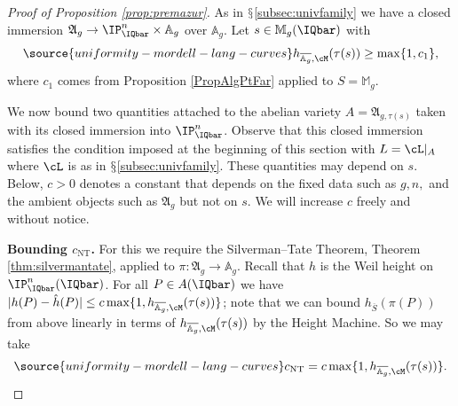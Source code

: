 \begin{proof}[Proof of Proposition \ref{prop:premazur}]
  As in $\mathsection$\ref{subsec:univfamily} %
  we have a
  closed immersion
  $\mathfrak{A}_g \rightarrow\IP^n_\IQbar\times \mathbb{A}_g$ over $\mathbb{A}_g$.
  Let $s\in \mathbb{M}_g(\IQbar)$  with
  \begin{equation}
    \label{eq:hslbc1}
\source{uniformity-mordell-lang-curves}
    h_{\overline{\mathbb{A}_g},\cM}(\tau(s)) \ge \max\{1,c_1\},
  \end{equation}
  where $c_1$
  comes from Proposition \ref{PropAlgPtFar} applied to $S = \mathbb{M}_g$.

  We now bound two quantities attached to the abelian variety
  $A=\mathfrak{A}_{g,\tau(s)}$ taken with its closed immersion into
  $\IP_\IQbar^n$. Observe that this closed immersion satisfies the
  condition imposed at the beginning of this section with $L=\cL|_A$
  where $\cL$ is as in $\mathsection$\ref{subsec:univfamily}.
  These quantities may depend on $s$. Below, $c>0$ denotes a constant
  that depends on the fixed data such as $g,n,$ and the ambient
  objects such as $\mathfrak{A}_g$ but not on  $s$.
  We will increase $c$ freely and without notice.


  \textbf{Bounding $c_{\mathrm{NT}}$.} For this we require the
  Silverman--Tate Theorem, Theorem \ref{thm:silvermantate}, applied to
  $\pi \colon \mathfrak{A}_g \rightarrow \mathbb{A}_g$. Recall that $h$ is the Weil
  height on $\IP^n_{\IQbar}(\IQbar)$.
  For all $P\in
  A(\IQbar)$ we have $|h(P)-\hat h(P)|\le c
  \max\{1,h_{\overline{\mathbb{A}_g},\cM}(\tau(s))\}$;
  note that we can bound $h_{\overline S}(\pi(P))$ from above linearly
  in terms of $h_{\overline{\mathbb{A}_g},\cM}(\tau(s))$ by the Height Machine.
  So we may take
  \begin{equation}
    \label{eq:choosecNT}
\source{uniformity-mordell-lang-curves}
    c_{\mathrm{NT}} = c\max\{1,h_{\overline{\mathbb{A}_g},\cM}(\tau(s))\}.
  \end{equation}



\end{proof}

